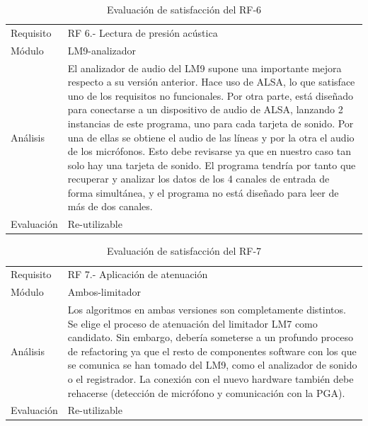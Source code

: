 \begin{table}[h]
\centering
\begin{tabularx}{1\textwidth}{l|X}
Requisito  & RF 6.- Lectura de presión acústica                                                                 \\
Módulo     & LM9-analizador                                                                          \\
Análisis   & El analizador de audio del \acrshort{LM9} supone una importante mejora respecto a su versión anterior. Hace uso de \acrshort{ALSA}, lo que satisface uno de los requisitos no funcionales. Por otra parte, está diseñado para conectarse a un dispositivo de audio de \acrshort{ALSA}, lanzando 2 instancias de este programa, uno para cada tarjeta de sonido. Por una de ellas se obtiene el audio de las líneas y por la otra el audio de los micrófonos. Esto debe revisarse ya que en nuestro caso tan solo hay una tarjeta de sonido. El programa tendría por tanto que recuperar y analizar los datos de los 4 canales de entrada de forma simultánea, y el programa no está diseñado para leer de más de dos canales. \\
Evaluación & Re-utilizable
\end{tabularx}
\caption{Evaluación de satisfacción del RF-6}
\end{table}

\begin{table}[h]
\centering
\begin{tabularx}{1\textwidth}{l|X}
Requisito  & RF 7.- Aplicación de atenuación                                                                \\
Módulo     & Ambos-limitador                                                                          \\
Análisis   & Los algoritmos en ambas versiones son completamente distintos. Se elige el proceso de atenuación del limitador \acrshort{LM7} como candidato. Sin embargo, debería someterse a un profundo proceso de refactoring ya que el resto de componentes software con los que se comunica se han tomado del \acrshort{LM9}, como el analizador de sonido o el registrador. La conexión con el nuevo hardware también debe rehacerse (detección de micrófono y comunicación con la \acrshort{PGA}). \\
Evaluación & Re-utilizable
\end{tabularx}
\caption{Evaluación de satisfacción del RF-7}
\end{table}

